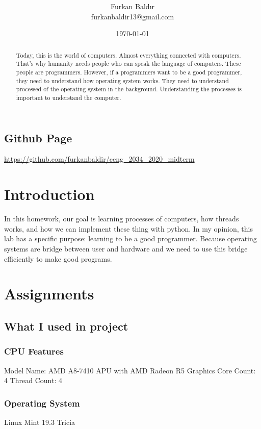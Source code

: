 \documentclass[]{article}
\title{\spacecaps{Assignment Report 1: Process and Thread Implementation}\\ \normalsize \spacesc{CENG2034, Operating Systems} }
\author{Furkan Baldır\\furkanbaldir13@gmail.com}
\date{\today}
\begin{document}
\maketitle

\begin{abstract}
	Today, this is the world of computers. Almost everything connected with computers. That's why humanity needs people who can speak the language of computers. These people are programmers.  However, if a programmers want to be a good programmer, they need to understand how operating system works. They need to understand processed of the operating system in the background. Understanding the processes is important to understand the computer.
\end{abstract}

\subsection*{Github Page}
\url{https://github.com/furkanbaldir/ceng\_2034\_2020\_midterm} 

\section{Introduction}
In this homework, our goal is learning processes of computers, how threads works, and how we can implement these thing with python. In my opinion, this lab has a specific purpose: learning to be a good programmer. Because operating systems are bridge between user and hardware and we need to use this bridge efficiently to make good programs.

\section{Assignments}

\subsection{What I used in project}

\subsubsection*{CPU Features}
Model Name: AMD A8-7410 APU with AMD Radeon R5 Graphics\newline
Core Count: 4\newline
Thread Count: 4
\subsubsection*{Operating System}
Linux Mint 19.3 Tricia
\end{document}
